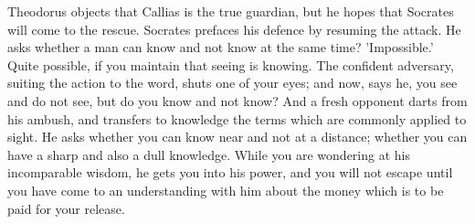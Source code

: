 Theodorus objects that Callias is the true guardian, but he hopes that
Socrates will come to the rescue. Socrates prefaces his defence by
resuming the attack. He asks whether a man can know and not know at the
same time? 'Impossible.' Quite possible, if you maintain that seeing is
knowing. The confident adversary, suiting the action to the word, shuts
one of your eyes; and now, says he, you see and do not see, but do
you know and not know? And a fresh opponent darts from his ambush, and
transfers to knowledge the terms which are commonly applied to sight.
He asks whether you can know near and not at a distance; whether you can
have a sharp and also a dull knowledge. While you are wondering at his
incomparable wisdom, he gets you into his power, and you will not escape
until you have come to an understanding with him about the money which
is to be paid for your release.

